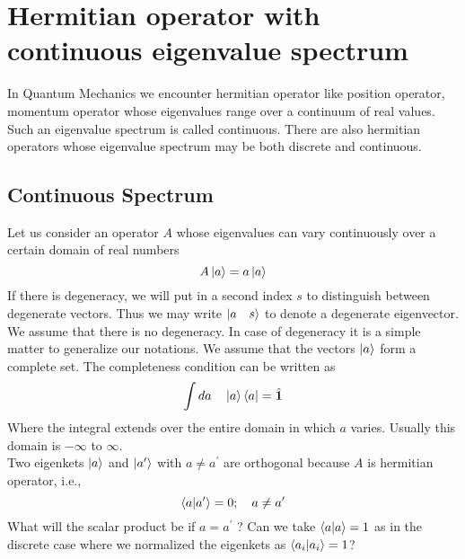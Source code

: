 	
	
	\section{Hermitian operator with continuous eigenvalue spectrum}
	In Quantum Mechanics we encounter hermitian operator like position operator, momentum operator whose eigenvalues range over a continuum of real values. Such an eigenvalue spectrum is called continuous. There are also hermitian operators whose eigenvalue spectrum may be both discrete and continuous.
	
		\subsection{Continuous Spectrum}
		Let us consider an operator $A$ whose eigenvalues can vary continuously over a certain domain of real numbers
		\begin{equation}
			A \ket{a} = a \ket{a}
			\label{chapter5.eqn9-eigenvalue}
		\end{equation}
		If there is degeneracy, we will put in a second index $s$ to distinguish between degenerate vectors. Thus we may write $\ket{a\quad s}$ to denote a degenerate eigenvector. We assume that there is no degeneracy. In case of degeneracy it is a simple matter to generalize our notations. We assume that the vectors $\ket{a}$ form a complete set. The completeness condition can be written as
		\begin{equation}
			\int da \quad \ket{a}\bra{a} = \hat{\mathbf{1}}
			\label{chapter5.eqn10-completenss-continuous}
		\end{equation}
		Where the integral extends over the entire domain in which $a$ varies. Usually this domain is $-\infty$ to $\infty$.\\
		
		Two eigenkets $\ket{a}$ and $\ket{a^\prime}$ with $a\neq a^\prime$ are orthogonal because $A$ is  hermitian operator, i.e.,
		\begin{equation}
			\braket{a}{a^\prime} = 0 ; \quad  a \neq a^\prime
			\label{chapter5.eqn11-orthogonal-continuous}
		\end{equation}
		What will the scalar product be if $a=a^\prime$ ? Can we take $\braket{a}{a} = 1$ as in the discrete case where we normalized the eigenkets as $\braket{a_i}{a_i} = 1$?\\
		
